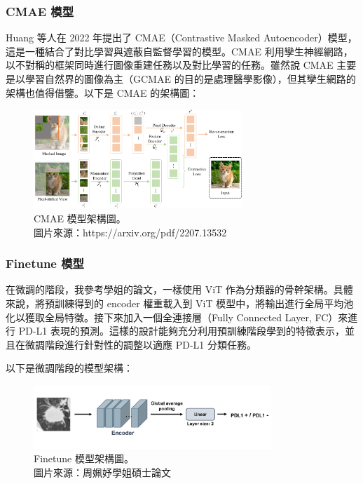 \documentclass[12pt,a4paper]{article}
\begin{document}
\newpage
\subsubsection{CMAE 模型}
Huang 等人在 2022 年提出了 CMAE（Contrastive Masked Autoencoder）模型，這是一種結合了對比學習與遮蔽自監督學習的模型。CMAE 利用孿生神經網路，以不對稱的框架同時進行圖像重建任務以及對比學習的任務。雖然說 CMAE 主要是以學習自然界的圖像為主（GCMAE 的目的是處理醫學影像），但其孿生網路的架構也值得借鑒。以下是 CMAE 的架構圖：

\begin{figure}[H]
  \centering
  \includegraphics[width=0.7\textwidth]{src/CMAE.png}
  \centering
  \caption{CMAE 模型架構圖。\\圖片來源：https://arxiv.org/pdf/2207.13532}
  \label{fig:CMAE-architecture}
\end{figure}

\subsubsection{Finetune 模型}
在微調的階段，我參考學姐的論文，一樣使用 ViT 作為分類器的骨幹架構。具體來說，將預訓練得到的 encoder 權重載入到 ViT 模型中，將輸出進行全局平均池化以獲取全局特徵。接下來加入一個全連接層（Fully Connected Layer, FC）來進行 PD-L1 表現的預測。這樣的設計能夠充分利用預訓練階段學到的特徵表示，並且在微調階段進行針對性的調整以適應 PD-L1 分類任務。

以下是微調階段的模型架構：
\begin{figure}[H]
  \centering
  \includegraphics[width=0.8\textwidth]{src/finetune.png}
  \centering
  \caption{Finetune 模型架構圖。\\圖片來源：周姵妤學姐碩士論文}
  \label{fig:finetune-architecture}
\end{figure}
\end{document}
